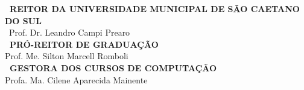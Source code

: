 \begin{estrutura}

  \center
    \vspace*{\fill}	
    
    {\ABNTEXchapterfont\bfseries\ REITOR DA UNIVERSIDADE MUNICIPAL DE SÃO CAETANO DO SUL} \\
    \ABNTEXchapterfont\ {Prof. Dr. Leandro Campi Prearo} \\
    \vspace{0.5cm}
    {\ABNTEXchapterfont\bfseries\ PRÓ-REITOR DE GRADUAÇÃO} \\
    Prof. Me. Silton Marcell Romboli \\
    \vspace{0.5cm}
     {\ABNTEXchapterfont\bfseries\ GESTORA DOS CURSOS DE COMPUTAÇÃO} \\
    Profa. Ma. Cilene Aparecida Mainente

    \vspace*{1cm}
\end{estrutura}

